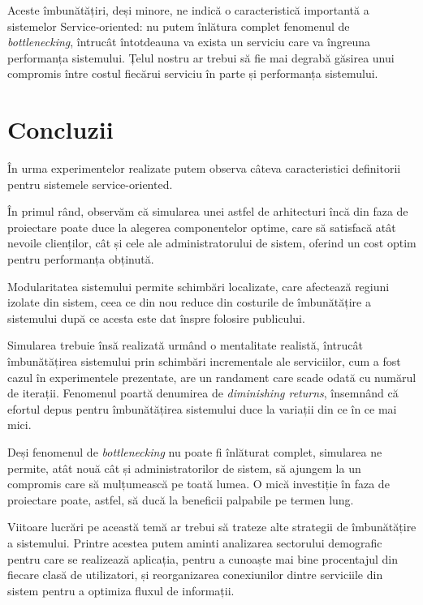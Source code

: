 \documentclass[12pt]{article}
\begin{document}
            Aceste îmbunătățiri, deși minore, ne indică o caracteristică importantă a sistemelor Service-oriented: nu putem înlătura complet fenomenul de \textit{bottlenecking}, întrucât întotdeauna va exista un serviciu care va îngreuna performanța sistemului. Țelul nostru ar trebui să fie mai degrabă găsirea unui compromis între costul fiecărui serviciu în parte și performanța sistemului.
            \pagebreak

    \section{Concluzii}
        În urma experimentelor realizate putem observa câteva caracteristici definitorii pentru sistemele service-oriented.

        În primul rând, observăm că simularea unei astfel de arhitecturi încă din faza de proiectare poate duce la alegerea componentelor optime, care să satisfacă atât nevoile clienților, cât și cele ale administratorului de sistem, oferind un cost optim pentru performanța obținută.

        Modularitatea sistemului permite schimbări localizate, care afectează regiuni izolate din sistem, ceea ce din nou reduce din costurile de îmbunătățire a sistemului după ce acesta este dat înspre folosire publicului.

        Simularea trebuie însă realizată urmând o mentalitate realistă, întrucât îm\-bu\-nă\-tă\-ți\-rea sistemului prin schimbări incrementale ale serviciilor, cum a fost cazul în experimentele prezentate, are un randament care scade odată cu numărul de iterații. Fenomenul poartă denumirea de \textit{diminishing returns}, însemnând că efortul depus pentru îmbunătățirea sistemului duce la variații din ce în ce mai mici.

        Deși fenomenul de \textit{bottlenecking} nu poate fi înlăturat complet, simularea ne permite, atât nouă cât și administratorilor de sistem, să ajungem la un compromis care să mulțumească pe toată lumea. O mică investiție în faza de proiectare poate, astfel, să ducă la beneficii palpabile pe termen lung.

        Viitoare lucrări pe această temă ar trebui să trateze alte strategii de îmbunătățire a sistemului. Printre acestea putem aminti analizarea sectorului demografic pentru care se realizează aplicația, pentru a cunoaște mai bine procentajul din fiecare clasă de utilizatori, și reorganizarea conexiunilor dintre serviciile din sistem pentru a optimiza fluxul de informații.
\end{document}
